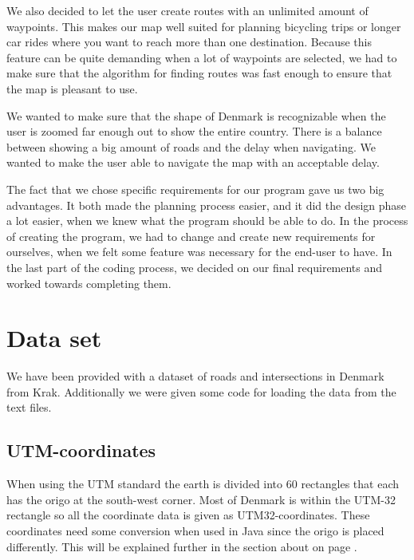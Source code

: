 We also decided to let the user create routes with an unlimited amount of
waypoints. This makes our map well suited for planning bicycling trips or longer
car rides where you want to reach more than one destination. Because this
feature can be quite demanding when a lot of waypoints are selected, we had to
make sure that the algorithm for finding routes was fast enough to ensure that the 
map is pleasant to use.

We wanted to make sure that the shape of Denmark is recognizable when
the user is zoomed far enough out to show the entire country. There is a balance between
showing a big amount of roads and the delay when navigating. We wanted to make
the user able to navigate the map with an acceptable delay. 

The fact that we chose specific requirements for our program gave us two big
advantages. It both made the planning process easier, and it did the design phase a lot 
easier, when we knew what the program should be able to do. In the process of creating the
program, we had to change and create new requirements for ourselves, when we
felt some feature was necessary for the end-user to have. In the last part of
the coding process, we decided on our final requirements and worked towards completing them. 

\section{Data set}
\label{BG-DS}
We have been provided with a dataset of roads and intersections in Denmark 
from Krak. Additionally we were given some code for loading the data from the 
text files.

\subsection{UTM-coordinates}
\label{BG-DS-UTM}
When using the UTM standard the earth is divided into 60 rectangles that each 
has the origo at the south-west corner. Most of Denmark is within the UTM-32 
rectangle so all the coordinate data is given as UTM32-coordinates.
These coordinates need some conversion when used in Java since the origo is placed 
differently. This will be explained further in the section about 
on page \pageref{UTM-conversion}.


